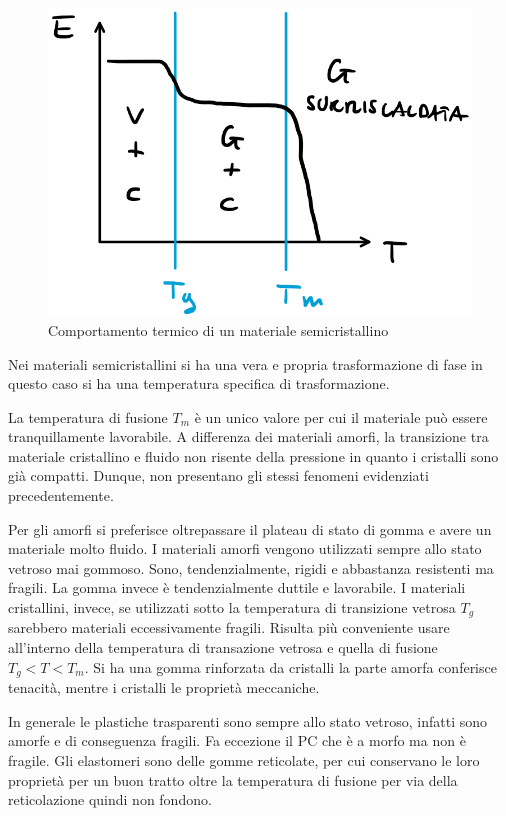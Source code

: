 \begin{figure}
\centering
\includegraphics[width = \textwidth]{gfx/TgTm}
\caption{Comportamento termico di un materiale semicristallino}
\label{fig:TgTm}
\end{figure}
Nei materiali semicristallini si ha una vera e propria trasformazione di fase in questo caso si ha una temperatura specifica di trasformazione.

La temperatura di fusione $T_m$ è un unico valore per cui il materiale può essere tranquillamente lavorabile. 
A differenza dei materiali amorfi, la transizione tra materiale cristallino e fluido non risente della pressione in quanto i cristalli sono già compatti.
Dunque, non presentano gli stessi fenomeni evidenziati precedentemente.
 
Per gli amorfi si preferisce oltrepassare il plateau di stato di gomma e avere un materiale molto fluido.
I materiali amorfi vengono utilizzati sempre allo stato vetroso mai gommoso. Sono, tendenzialmente, rigidi e abbastanza resistenti ma fragili. La gomma invece è tendenzialmente duttile e lavorabile.
I materiali cristallini, invece, se utilizzati sotto la temperatura di transizione vetrosa $T_g$ sarebbero materiali eccessivamente fragili. Risulta più conveniente usare all'interno della temperatura di transazione vetrosa e quella di fusione $T_g < T < T_m$. Si ha una gomma rinforzata da cristalli la parte amorfa conferisce tenacità, mentre i cristalli le proprietà meccaniche. 

In generale le plastiche trasparenti sono sempre allo stato vetroso, infatti sono amorfe e di conseguenza fragili. Fa eccezione il \ac{PC} che è a morfo ma non è fragile.
Gli elastomeri sono delle gomme reticolate, per cui conservano le loro proprietà per un buon tratto oltre la temperatura di fusione per via della reticolazione quindi non fondono.


